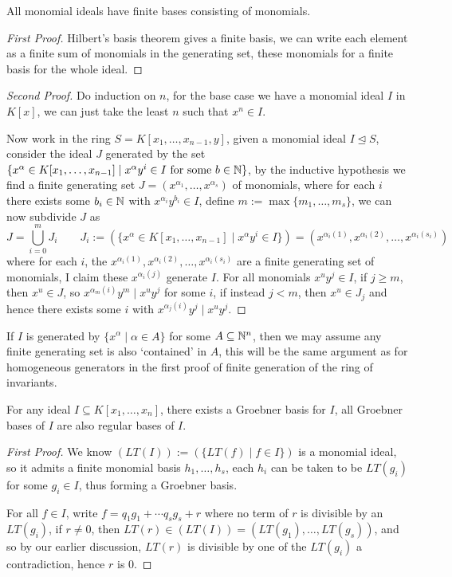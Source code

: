 \documentclass{article}
\begin{document}
\begin{proposition}
    All monomial ideals have finite bases consisting of monomials.
    \begin{proof}[First Proof]
        Hilbert's basis theorem gives a finite basis, we can write each element as a finite sum of monomials in the generating set, these monomials for a finite basis for the whole ideal.
    \end{proof}
    \begin{proof}[Second Proof]
        Do induction on $n$, for the base case we have a monomial ideal $I$ in $K[x]$, we can just take the least $n$ such that $x^n\in I$.

        Now work in the ring $S = K[x_1,\ldots,x_{n-1},y]$, given a monomial ideal $I\unlhd S$, consider the ideal $J$ generated by the set $\{x^\alpha \in K[x_1,\ldots,x_{n-1}] \mid x^\alpha y^i \in I \text{ for some $b\in \mathbb{N}$}\}$, by the inductive hypothesis we find a finite generating set $J = (x^{\alpha_1},\ldots,x^{\alpha_s})$ of monomials, where for each $i$ there exists some $b_i\in \mathbb{N}$ with $x^{\alpha_i}y^{b_i}\in I$, define $m := \max\{m_1,\ldots,m_s\}$, we can now subdivide $J$ as \[
        J = \bigcup_{i=0}^m J_i \qquad J_i := (\{x^\alpha \in K[x_1,\ldots, x_{n-1}] \mid x^\alpha y^i \in I\}) = (x^{\alpha_i(1)}, x^{\alpha_i(2)},\ldots, x^{\alpha_i(s_i)})
        \] where for each $i$, the $x^{\alpha_i(1)}, x^{\alpha_i(2)},\ldots, x^{\alpha_i(s_i)}$ are a finite generating set of monomials, I claim these $x^{\alpha_i(j)}$ generate $I$. For all monomials $x^u y^j\in I$, if $j\geq m$, then $x^u\in J$, so $x^{\alpha_m(i)}y^{m}\mid x^uy^j$ for some $i$, if instead $j<m$, then $x^u\in J_j$ and hence there exists some $i$ with $x^{\alpha_j(i)}y^j\mid x^uy^j$.
    \end{proof}
\end{proposition}

If $I$ is generated by $\{x^\alpha \mid \alpha \in A\}$ for some $A\subseteq \mathbb{N}^n$, then we may assume any finite generating set is also `contained' in $A$, this will be the same argument as for homogeneous generators in the first proof of finite generation of the ring of invariants.

\begin{theorem}
    For any ideal $I\subseteq K[x_1,\ldots,x_n]$, there exists a Groebner basis for $I$, all Groebner bases of $I$ are also regular bases of $I$.
    \begin{proof}[First Proof]
        We know $(LT(I)) := (\{LT(f) \mid f\in I\})$ is a monomial ideal, so it admits a finite monomial basis $h_1,\ldots, h_s$, each $h_i$ can be taken to be $LT(g_i)$ for some $g_i\in I$, thus forming a Groebner basis.

        For all $f\in I$, write $f = q_1g_1 + \cdots q_sg_s + r$ where no term of $r$ is divisible by an $LT(g_i)$, if $r\neq 0$, then $LT(r) \in (LT(I)) = (LT(g_1),\ldots,LT(g_s))$, and so by our earlier discussion, $LT(r)$ is divisible by one of the $LT(g_i)$ a contradiction, hence $r$ is $0$.
    \end{proof}
\end{theorem}
\end{document}
